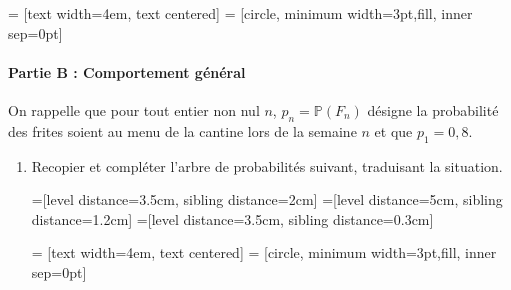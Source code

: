 \documentclass[11pt,fleqn, openany]{book} %
\begin{document}
\begin{exercise}
\begin{minipage}{0.4\linewidth}
 = [text width=4em, text centered]
 = [circle, minimum width=3pt,fill, inner sep=0pt]


\begin{center}
\end{center}


\end{minipage}

\newpage

\paragraph{Partie B : Comportement général}

On rappelle que pour tout entier non nul $n$, $p_n=\mathbb{P}(F_n)$ désigne la probabilité des frites soient au menu de la cantine lors de la semaine $n$ et que $p_1=0,8$.

\begin{enumerate}
\item Recopier et compléter l'arbre de probabilités suivant, traduisant la situation.

    
    =[level distance=3.5cm, sibling distance=2cm]
=[level distance=5cm, sibling distance=1.2cm]
=[level distance=3.5cm, sibling distance=0.3cm]

 = [text width=4em, text centered]
 = [circle, minimum width=3pt,fill, inner sep=0pt]



\end{enumerate}
\end{exercise}
\end{document}

